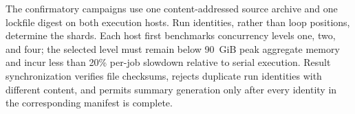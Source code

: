 The confirmatory campaigns use one content-addressed source archive and one
lockfile digest on both execution hosts. Run identities, rather than loop
positions, determine the shards. Each host first benchmarks concurrency levels
one, two, and four; the selected level must remain below 90~GiB peak aggregate
memory and incur less than 20\% per-job slowdown relative to serial execution.
Result synchronization verifies file checksums, rejects duplicate run
identities with different content, and permits summary generation only after
every identity in the corresponding manifest is complete.
